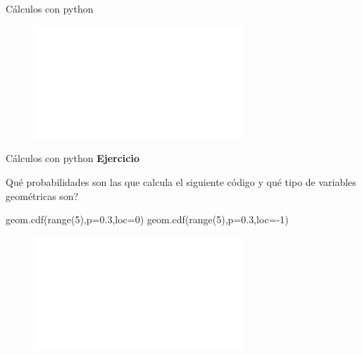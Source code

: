 \documentclass[
  ignorenonframetext,
  aspectratio=169]{beamer}
\newenvironment{Shaded}{\begin{snugshade}}{\end{snugshade}}
\newcommand{\BuiltInTok}[1]{\textcolor[rgb]{0.00,0.23,0.31}{#1}}
\newcommand{\DecValTok}[1]{\textcolor[rgb]{0.68,0.00,0.00}{#1}}
\newcommand{\FloatTok}[1]{\textcolor[rgb]{0.68,0.00,0.00}{#1}}
\newcommand{\NormalTok}[1]{\textcolor[rgb]{0.00,0.23,0.31}{#1}}
\newcommand{\OperatorTok}[1]{\textcolor[rgb]{0.37,0.37,0.37}{#1}}
\begin{document}
\begin{frame}[fragile]{Cálculos con python}
\begin{figure}

{\centering \includegraphics[width=0.7\textwidth,height=\textheight]{Tema_3_1_Notables_files/figure-beamer/py_random_binom-9.pdf}

}

\end{figure}
\end{frame}

\begin{frame}[fragile]{Cálculos con python}
\protect\hypertarget{cuxe1lculos-con-python-2}{}
\textbf{Ejercicio}

Qué probabilidades son las que calcula el siguiente código y qué tipo de
variables geométricas son?

\begin{Shaded}
\begin{Highlighting}[]
\NormalTok{geom.cdf(}\BuiltInTok{range}\NormalTok{(}\DecValTok{5}\NormalTok{),p}\OperatorTok{=}\FloatTok{0.3}\NormalTok{,loc}\OperatorTok{=}\DecValTok{0}\NormalTok{)}
\NormalTok{geom.cdf(}\BuiltInTok{range}\NormalTok{(}\DecValTok{5}\NormalTok{),p}\OperatorTok{=}\FloatTok{0.3}\NormalTok{,loc}\OperatorTok{={-}}\DecValTok{1}\NormalTok{)}
\end{Highlighting}
\end{Shaded}

\begin{figure}

{\centering \includegraphics[width=0.7\textwidth,height=\textheight]{Tema_3_1_Notables_files/figure-beamer/unnamed-chunk-20-11.pdf}

}

\end{figure}
\end{frame}
\end{document}
